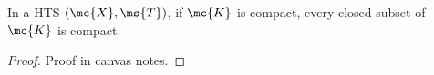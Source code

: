 \begin{nproposition}{}
	In a HTS \((\mc{X},\ms{T})\), if \(\mc{K}\) is compact, every closed subset of \(\mc{K}\) is compact.
\end{nproposition}
\begin{proof}
	Proof in canvas notes.
\end{proof}
\begin{comment}
	\begin{proof}
		Let \(\mc{F}\) be closed, with \(\mc{F}\subseteq\mc{K}\). Let \(\ms{G}\) be an open cover of \(\mc{F}\); say \(\ms{G}=\{\mc{G}_{\alpha}:\alpha\in\mc{A}\}\) for some index set \(\mc{A}\). Then, \(\mc{F}\subseteq\displaystyle\bigcup_{\alpha\in\mc{A}}\mc{G}_{\alpha}\), so \(\mc{K}\subseteq\mc{F}^c\cup\displaystyle\bigcup_{\alpha\in\mc{A}}\mc{G}_{\alpha}\) and \(\ms{G}=\{\mc{F}^c\}\) will be an open cover for \(\mc{K}\); it must have a finite subcover (for \(\mc{K}\)). Let \(\mc{V}_1,\dots,\mc{V}_N\in\ms{G}\cup\{\mc{F}^c\}\) such that  
	\end{proof}
\end{comment}